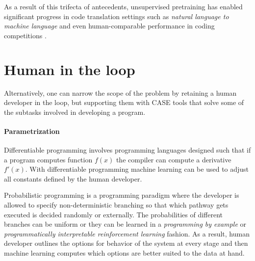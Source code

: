 As a result of this trifecta of antecedents, unsupervised pretraining has enabled significant progress in code translation settings such as \emph{natural language to machine language} \cite{chenEvaluatingLargeLanguage2021, conala, guoContentEnhancedBERTbased2020, hallerPECCProblemExtraction2024, hendrycksMeasuringCodingChallenge2021, honarvarTurbulenceSystematicallyAutomatically2025, huQualityFlowAgenticWorkflow2025, jimenezSWEbenchCanLanguage2024, leiPlanningDrivenProgrammingLarge2025, liEnablingProgrammingThinking2023, liExploringEffectivenessLlms2023, psb2, solimanMarianCGCodeGeneration2022, the-crypt-keeperThecryptkeeperCanaicode2025, zhuoBigCodeBenchBenchmarkingCode2024} and even human-comparable performance in coding competitions \cite{liCompetitionLevelCodeGeneration2022,openaiCompetitiveProgrammingLarge2025}.

\newpage
\section{Human in the loop}
\label{sec:human}

Alternatively, one can narrow the scope of the problem by retaining a human developer in the loop, but supporting them with CASE \cite{caseComputeraidedSoftwareEngineering1985} tools that solve some of the subtasks involved in developing a program.

\paragraph{Parametrization}

Differentiable programming \cite{blondelElementsDifferentiableProgramming2024} involves programming languages designed such that if a program computes function $f(x)$ the compiler can compute a derivative $f'(x)$. 
With differentiable programming machine learning can be used to adjust all constants defined by the human developer.

Probabilistic programming \cite{gordonProbabilisticProgramming2014} is a programming paradigm where the developer is allowed to specify non-deterministic branching so that which pathway gets executed is decided randomly or externally.
The probabilities of different branches can be uniform or they can be learned in a \emph{programming by example} or \emph{programmatically interpretable reinforcement learning} fashion.
As a result, human developer outlines the options for behavior of the system at every stage and then machine learning computes which options are better suited to the data at hand.


